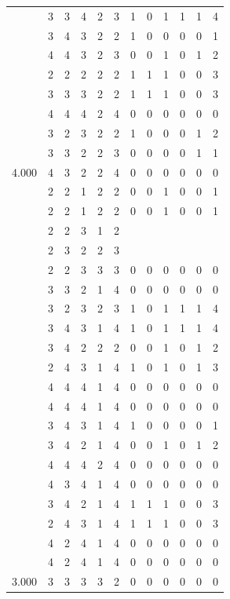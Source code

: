 \documentclass[]{msu-thesis}
\theoremstyle{definition}
\theoremstyle{definition}
\theoremstyle{definition}
\theoremstyle{remark}
\begin{document}
\begin{table}
{\begin{tabular}[t]{rrrrrrrrrrrr}
 & 3 & 3 & 4 & 2 & 3 & 1 & 0 & 1 & 1 & 1 & 4\\
 & 3 & 4 & 3 & 2 & 2 & 1 & 0 & 0 & 0 & 0 & 1\\
 & 4 & 4 & 3 & 2 & 3 & 0 & 0 & 1 & 0 & 1 & 2\\
 & 2 & 2 & 2 & 2 & 2 & 1 & 1 & 1 & 0 & 0 & 3\\
 & 3 & 3 & 3 & 2 & 2 & 1 & 1 & 1 & 0 & 0 & 3\\
 & 4 & 4 & 4 & 2 & 4 & 0 & 0 & 0 & 0 & 0 & 0\\
 & 3 & 2 & 3 & 2 & 2 & 1 & 0 & 0 & 0 & 1 & 2\\
 & 3 & 3 & 2 & 2 & 3 & 0 & 0 & 0 & 0 & 1 & 1\\
4.000 & 4 & 3 & 2 & 2 & 4 & 0 & 0 & 0 & 0 & 0 & 0\\
 & 2 & 2 & 1 & 2 & 2 & 0 & 0 & 1 & 0 & 0 & 1\\
 & 2 & 2 & 1 & 2 & 2 & 0 & 0 & 1 & 0 & 0 & 1\\
 & 2 & 2 & 3 & 1 & 2 &  &  &  &  &  & \\
 & 2 & 3 & 2 & 2 & 3 &  &  &  &  &  & \\
 & 2 & 2 & 3 & 3 & 3 & 0 & 0 & 0 & 0 & 0 & 0\\
 & 3 & 3 & 2 & 1 & 4 & 0 & 0 & 0 & 0 & 0 & 0\\
 & 3 & 2 & 3 & 2 & 3 & 1 & 0 & 1 & 1 & 1 & 4\\
 & 3 & 4 & 3 & 1 & 4 & 1 & 0 & 1 & 1 & 1 & 4\\
 & 3 & 4 & 2 & 2 & 2 & 0 & 0 & 1 & 0 & 1 & 2\\
 & 2 & 4 & 3 & 1 & 4 & 1 & 0 & 1 & 0 & 1 & 3\\
 & 4 & 4 & 4 & 1 & 4 & 0 & 0 & 0 & 0 & 0 & 0\\
 & 4 & 4 & 4 & 1 & 4 & 0 & 0 & 0 & 0 & 0 & 0\\
 & 3 & 4 & 3 & 1 & 4 & 1 & 0 & 0 & 0 & 0 & 1\\
 & 3 & 4 & 2 & 1 & 4 & 0 & 0 & 1 & 0 & 1 & 2\\
 & 4 & 4 & 4 & 2 & 4 & 0 & 0 & 0 & 0 & 0 & 0\\
 & 4 & 3 & 4 & 1 & 4 & 0 & 0 & 0 & 0 & 0 & 0\\
 & 3 & 4 & 2 & 1 & 4 & 1 & 1 & 1 & 0 & 0 & 3\\
 & 2 & 4 & 3 & 1 & 4 & 1 & 1 & 1 & 0 & 0 & 3\\
 & 4 & 2 & 4 & 1 & 4 & 0 & 0 & 0 & 0 & 0 & 0\\
 & 4 & 2 & 4 & 1 & 4 & 0 & 0 & 0 & 0 & 0 & 0\\
3.000 & 3 & 3 & 3 & 3 & 2 & 0 & 0 & 0 & 0 & 0 & 0\\

\end{tabular}}
\end{table}
\end{document}
